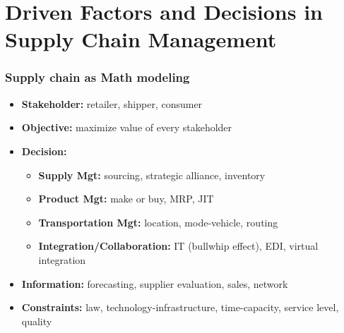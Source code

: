 \documentclass[10pt,handout,notes=show]{beamer}
\begin{document}
\section[Decisions]{Driven Factors and Decisions in Supply Chain Management}
\begin{frame}
  \frametitle{Supply chain as Math modeling}


  \begin{itemize}
    \item \textbf{Stakeholder:} retailer, shipper, \alert{consumer}
    \item \textbf{Objective:} maximize \alert{value} of \alert{every stakeholder}
    \item \textbf{Decision:}
    \begin{itemize}
      \item \textbf{Supply Mgt:} \alert{sourcing}, strategic alliance, inventory
      \item \textbf{Product Mgt:} make or buy, MRP, JIT
      \item \textbf{Transportation Mgt:} location, mode-vehicle, routing
      \item \textbf{Integration/Collaboration:} IT (bullwhip effect), EDI, virtual integration \\[5ex]
    \end{itemize}
    \item \textbf{Information:}  forecasting, supplier evaluation, sales, network
    \item \textbf{Constraints:} \alert{law}, technology-infrastructure, \alert{time-capacity}, service level, quality
  \end{itemize}



\end{frame}
\end{document}
